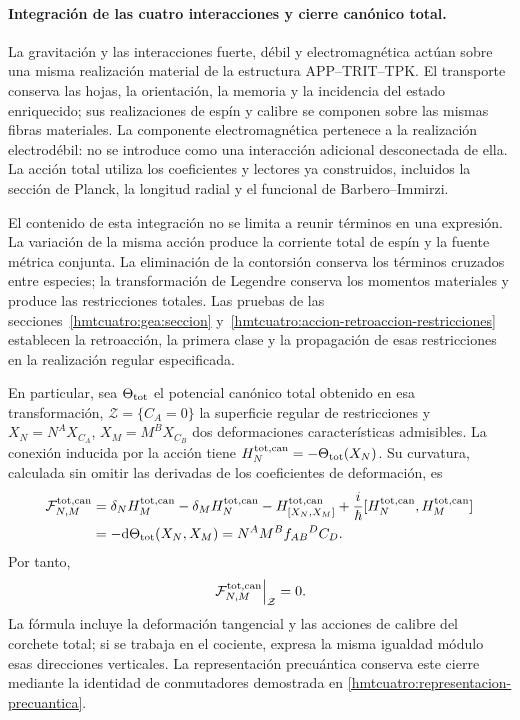 \paragraph{Integración de las cuatro interacciones y cierre canónico total.}
La gravitación y las interacciones fuerte, débil y electromagnética
actúan sobre una misma realización material de la estructura
APP--TRIT--TPK. El transporte conserva las hojas, la orientación,
la memoria y la incidencia del estado enriquecido; sus realizaciones
de espín y calibre se componen sobre las mismas fibras materiales.
La componente electromagnética pertenece a la realización
electrodébil: no se introduce como una interacción adicional
desconectada de ella. La acción total utiliza los coeficientes y
lectores ya construidos, incluidos la sección de Planck, la longitud
radial y el funcional de Barbero--Immirzi.

El contenido de esta integración no se limita a reunir términos en
una expresión. La variación de la misma acción produce la corriente
total de espín y la fuente métrica conjunta. La eliminación de la
contorsión conserva los términos cruzados entre especies; la
transformación de Legendre conserva los momentos materiales y
produce las restricciones totales. Las pruebas de las
secciones~\ref{hmtcuatro:gea:seccion}
y~\ref{hmtcuatro:accion-retroaccion-restricciones}
establecen la retroacción, la primera clase y la propagación de
esas restricciones en la realización regular especificada.

En particular, sea $\Theta_{\rm tot}$ el potencial canónico total
obtenido en esa transformación, $\mathcal Z=\{C_A=0\}$ la superficie
regular de restricciones y $X_N=N^AX_{C_A}$,
$X_M=M^BX_{C_B}$ dos deformaciones características admisibles.
La conexión inducida por la acción tiene
$H_N^{\rm tot,can}=-\Theta_{\rm tot}(X_N)$. Su curvatura, calculada
sin omitir las derivadas de los coeficientes de deformación, es
\begin{equation}
\begin{aligned}
\mathcal F^{\rm tot,can}_{N,M}
&=\delta_NH_M^{\rm tot,can}-\delta_MH_N^{\rm tot,can}
 -H_{[X_N,X_M]}^{\rm tot,can}
 +\frac{i}{\hbar}[H_N^{\rm tot,can},H_M^{\rm tot,can}]\\
&=-\mathrm d\Theta_{\rm tot}(X_N,X_M)
 =N^AM^B f_{AB}{}^{D}C_D.
\end{aligned}
\label{hmtcuatro:conclusion-curvatura-total}
\end{equation}
Por tanto,
\[
 \left.\mathcal F^{\rm tot,can}_{N,M}\right|_{\mathcal Z}=0.
\]
La fórmula incluye la deformación tangencial y las acciones de
calibre del corchete total; si se trabaja en el cociente, expresa
la misma igualdad módulo esas direcciones verticales. La
representación precuántica conserva este cierre mediante la
identidad de conmutadores demostrada en
\eqref{hmtcuatro:representacion-precuantica}.

